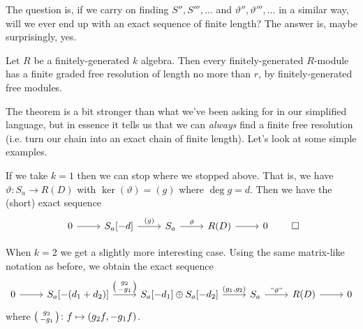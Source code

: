 \documentclass[10pt,notitlepage]{article}
\numberwithin{equation}{subsection}
\begin{document}
        The question is, if we carry on finding $S'',S''',\ldots$ and $\vartheta'',\vartheta''',\ldots$ in a similar way, will we ever end up with an exact sequence of finite length?
        The answer is, maybe surprisingly, yes.

        \begin{theorem}
            Let $R$ be a finitely-generated $k$ algebra.
            Then every finitely-generated $R$-module has a finite graded free resolution of length no more than $r$, by finitely-generated free modules.
        \end{theorem}

        The theorem is a bit stronger than what we've been asking for in our simplified language, but in essence it tells us that we can \emph{always} find a finite free resolution (i.e. turn our chain into an exact chain of finite length).
        Let's look at some simple examples.

        \begin{example}[$k=1$]\label{ex:k-equals-1}
            If we take $k=1$ then we can stop where we stopped above.
            That is, we have $\vartheta\colon S_a\to R(D)$ with $\ker(\vartheta)=(g)$ where $\deg g=d$.
            Then we have the (short) exact sequence
            \begin{equation*}
                \begin{tikzcd}
                    0 \arrow{r}
                    & S_a[-d] \rar{(g)}
                    & S_a \rar{\vartheta}
                    & R(D) \arrow{r}
                    & 0
                \end{tikzcd}\qedhere
            \end{equation*}
        \end{example}

        \begin{example}[$k=2$]\label{ex:k-equals-2}
            When $k=2$ we get a slightly more interesting case.
            Using the same matrix-like notation as before, we obtain the exact sequence
            \begin{equation*}
                \begin{tikzcd}
                    0 \arrow{r}
                    & S_a[-(d_1+d_2)] \rar{\smqty(g_2\\-g_1)}
                    & S_a[-d_1]\oplus S_a[-d_2] \rar{(g_1,g_2)}
                    & S_a \rar{"\vartheta"}
                    & R(D) \arrow{r}
                    & 0
                \end{tikzcd}
            \end{equation*}
            where $\smqty(g_2\\-g_1)\colon f\mapsto (g_2f, -g_1f)$.
        \end{example}
\end{document}
